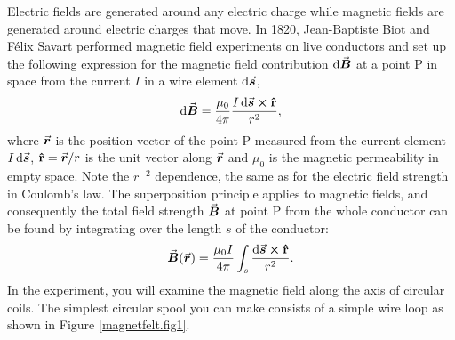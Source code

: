 \documentclass[../Elmag-labhefte-2020.tex]{subfiles}
\begin{document}
Electric fields are generated around any electric charge while magnetic fields are generated around electric charges that move. In 1820, Jean-Baptiste Biot and Félix Savart performed magnetic field experiments on live conductors and set up the following expression for the magnetic field contribution $\dd{\va*{B}}$ at a point P in space from the current $I$ in a wire element $\dd{\va*{s}}$,
\begin{equation}
    \dd{\va*{B}} = \frac{\mu_0}{4\pi} \frac{I \dd{\va*{s}} \cross \vu{r}}{r^2} ,
    \label{eq:Biot.Savart}
\end{equation}
where $\va*{r}$ is the position vector of the point P measured from the current element $I \dd{\va*{s}}$, $\vu{r} = \va*{r}/r$ is the unit vector along $\va*{r}$ and $\mu_0$ is the magnetic permeability in empty space. Note the $r^{-2}$ dependence, the same as for the electric field strength in Coulomb's law. The superposition principle applies to magnetic fields, and consequently the total field strength $\va*{B}$ at point P from the whole conductor can be found by integrating over the length $s$ of the conductor:
\begin{equation}
    \va*{B}(\va*{r}) = \frac{\mu_0 I}{4 \pi} \int_s \frac{ \dd{\va*{s}} \cross \vu{r}} {r^2} .
    \label{eq:Biot.Savart2}
\end{equation}
%
In the experiment, you will examine the magnetic field along the axis of circular coils. The simplest circular spool you can make consists of a simple wire loop as shown in Figure \ref{magnetfelt.fig1}.
\end{document}
